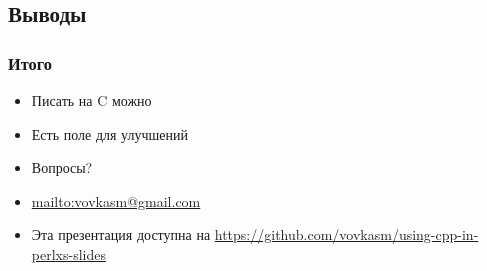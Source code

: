\documentclass[pdflatex,hyperref={unicode=true}]{beamer}
\DeclareRobustCommand{\cpp}{
    \texorpdfstring{\hbox{C\hspace{-0.5ex}\protect\raisebox{0.5ex}{\protect\scalebox{0.67}{++}}}}{C++}
}
\begin{document}
\subsection{Выводы}
\begin{frame}
    \frametitle{Итого}
    \begin{itemize}
        \item<1-> Писать на \cpp можно
        \item<2-> Есть поле для улучшений
        \item<3-> Вопросы?
        \item<4-> \url{mailto:vovkasm@gmail.com}
        \item<4-> Эта презентация доступна на \url{https://github.com/vovkasm/using-cpp-in-perlxs-slides}
    \end{itemize}
\end{frame}
\end{document}
